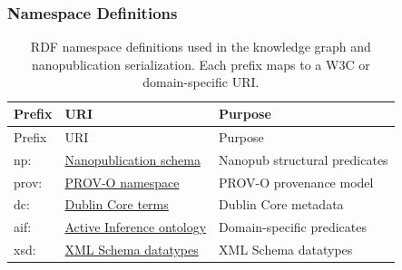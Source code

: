 \documentclass[
  english,
]{article}
\begin{document}
\subsubsection{Namespace Definitions}\label{namespace-definitions}

\begin{longtable}[]{@{}
  >{\raggedright\arraybackslash}p{}
  >{\raggedright\arraybackslash}p{}
  >{\raggedright\arraybackslash}p{}@{}}
\caption{RDF namespace definitions used in the knowledge graph and
nanopublication serialization. Each prefix maps to a W3C or
domain-specific URI.}\label{tab:namespace_definitions}\tabularnewline
\toprule\noalign{}
\begin{minipage}[b]{\linewidth}\raggedright
Prefix
\end{minipage} & \begin{minipage}[b]{\linewidth}\raggedright
URI
\end{minipage} & \begin{minipage}[b]{\linewidth}\raggedright
Purpose
\end{minipage} \\
\midrule\noalign{}
\endfirsthead
\toprule\noalign{}
\begin{minipage}[b]{\linewidth}\raggedright
Prefix
\end{minipage} & \begin{minipage}[b]{\linewidth}\raggedright
URI
\end{minipage} & \begin{minipage}[b]{\linewidth}\raggedright
Purpose
\end{minipage} \\
\midrule\noalign{}
\endhead
\bottomrule\noalign{}
\endlastfoot
np: & \href{http://www.nanopub.org/nschema\#}{Nanopublication schema} &
Nanopub structural predicates \\
prov: & \href{http://www.w3.org/ns/prov\#}{PROV-O namespace} & PROV-O
provenance model \\
dc: & \href{http://purl.org/dc/terms/}{Dublin Core terms} & Dublin Core
metadata \\
aif: & \href{http://activeinference.institute/ontology/}{Active
Inference ontology} & Domain-specific predicates \\
xsd: & \href{http://www.w3.org/2001/XMLSchema\#}{XML Schema datatypes} &
XML Schema datatypes \\
\end{longtable}
\end{document}
